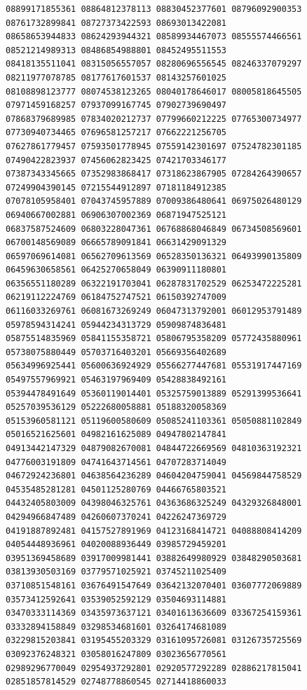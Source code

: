 \documentclass[10pt]{article}
\begin{document}
\begin{verbatim}
08899171855361 08864812378113 08830452377601 08796092900353 08761732899841 08727373422593 08693013422081
08658653944833 08624293944321 08589934467073 08555574466561 08521214989313 08486854988801 08452495511553
08418135511041 08315056557057 08280696556545 08246337079297 08211977078785 08177617601537 08143257601025
08108898123777 08074538123265 08040178646017 08005818645505 07971459168257 07937099167745 07902739690497
07868379689985 07834020212737 07799660212225 07765300734977 07730940734465 07696581257217 07662221256705
07627861779457 07593501778945 07559142301697 07524782301185 07490422823937 07456062823425 07421703346177
07387343345665 07352983868417 07318623867905 07284264390657 07249904390145 07215544912897 07181184912385
07078105958401 07043745957889 07009386480641 06975026480129 06940667002881 06906307002369 06871947525121
06837587524609 06803228047361 06768868046849 06734508569601 06700148569089 06665789091841 06631429091329
06597069614081 06562709613569 06528350136321 06493990135809 06459630658561 06425270658049 06390911180801
06356551180289 06322191703041 06287831702529 06253472225281 06219112224769 06184752747521 06150392747009
06116033269761 06081673269249 06047313792001 06012953791489 05978594314241 05944234313729 05909874836481
05875514835969 05841155358721 05806795358209 05772435880961 05738075880449 05703716403201 05669356402689
05634996925441 05600636924929 05566277447681 05531917447169 05497557969921 05463197969409 05428838492161
05394478491649 05360119014401 05325759013889 05291399536641 05257039536129 05222680058881 05188320058369
05153960581121 05119600580609 05085241103361 05050881102849 05016521625601 04982161625089 04947802147841
04913442147329 04879082670081 04844722669569 04810363192321 04776003191809 04741643714561 04707283714049
04672924236801 04638564236289 04604204759041 04569844758529 04535485281281 04501125280769 04466765803521
04432405803009 04398046325761 04363686325249 04329326848001 04294966847489 04260607370241 04226247369729
04191887892481 04157527891969 04123168414721 04088808414209 04054448936961 04020088936449 03985729459201
03951369458689 03917009981441 03882649980929 03848290503681 03813930503169 03779571025921 03745211025409
03710851548161 03676491547649 03642132070401 03607772069889 03573412592641 03539052592129 03504693114881
03470333114369 03435973637121 03401613636609 03367254159361 03332894158849 03298534681601 03264174681089
03229815203841 03195455203329 03161095726081 03126735725569 03092376248321 03058016247809 03023656770561
02989296770049 02954937292801 02920577292289 02886217815041 02851857814529 02748778860545 02714418860033

\end{verbatim}
\end{document}
